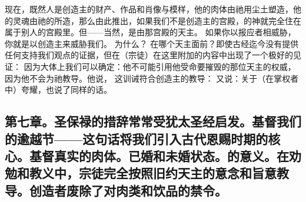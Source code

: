 现在，既然人是创造主的财产、作品和肖像与模样，他的肉体由祂用尘土塑造，他的灵魂由祂的所造，那么由此推出，如果我们不是创造主的宫殿，的神就完全住在属于别人的宫殿里。但——当然，是由那宫殿的天主。 如果你以报应者相威胁，你就是以创造主来威胁我们。 为什么？ 在哪个天主面前？即使古经迄今没有提供任何支持我们观点的证据，但在（宗徒）在这里附加的内容中出现了一个极好的见证： 因为大体上我们可以确定：他不可能引用他受命要摧毁的那位天主的权威，因为他不会为祂教导。他说， 这训诫符合创造主的教导： 又说：关于（在掌权者中）夸耀，也说了同样的话。\par


\subsection{第七章。圣保禄的措辞常常受犹太圣经启发。基督我们的逾越节——这句话将我们引入古代恩赐时期的核心。基督真实的肉体。已婚和未婚状态。的意义。在劝勉和教义中，宗徒完全按照旧约天主的意念和旨意教导。创造者废除了对肉类和饮品的禁令。}


